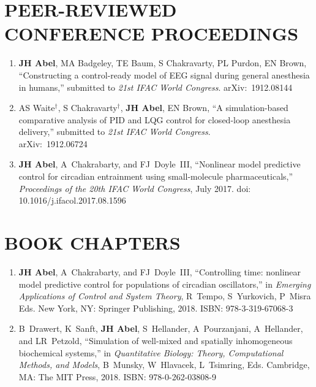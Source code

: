 \documentclass[line,10pt]{res}
\begin{document}
\begin{resume}
\section{\bf PEER-REVIEWED CONFERENCE PROCEEDINGS}
\vspace{1em}\null
\begin{enumerate}
    \setlength\itemsep{0.8em}
    \item \textbf{JH Abel}, MA Badgeley, TE Baum, S Chakravarty, PL Purdon, EN Brown, ``Constructing a control-ready model of EEG signal during general anesthesia in humans,'' submitted to \textit{21st IFAC World Congress}. arXiv:~1912.08144
    \item AS Waite$^\dag$, S Chakravarty$^\dag$, \textbf{JH Abel}, EN Brown, ``A simulation-based comparative analysis of PID and LQG control for closed-loop anesthesia delivery,'' submitted to \textit{21st IFAC World Congress}.\\arXiv:~1912.06724
    \item \textbf{JH Abel}, A~Chakrabarty, and FJ~Doyle~III, ``Nonlinear model predictive control for circadian entrainment using small-molecule pharmaceuticals,'' \textit{Proceedings of the 20th IFAC World Congress}, July 2017. doi: %
    10.1016/j.ifacol.2017.08.1596%
\end{enumerate}

\section{\bf BOOK CHAPTERS}
\vspace{1em}\null
\begin{enumerate}
    \setlength\itemsep{0.8em}
    \item \textbf{JH Abel}, A~Chakrabarty, and FJ~Doyle~III, ``Controlling time: nonlinear model predictive control for populations of circadian oscillators,'' in \textit{Emerging Applications of Control and System Theory}, R~Tempo, S~Yurkovich, P~Misra Eds. New York, NY: Springer Publishing, 2018. ISBN: 978-3-319-67068-3
    \item B~Drawert, K~Sanft, \textbf{JH Abel}, S~Hellander, A~Pourzanjani, A~Hellander, and LR~Petzold, ``Simulation of well-mixed and spatially inhomogeneous biochemical systems,'' in \textit{Quantitative Biology: Theory, Computational Methods, and Models},
B~Munsky, W~Hlavacek, L~Tsimring, Eds.
Cambridge, MA: The MIT Press, 2018. ISBN: 978-0-262-03808-9
\end{enumerate}


\end{resume}
\end{document}
